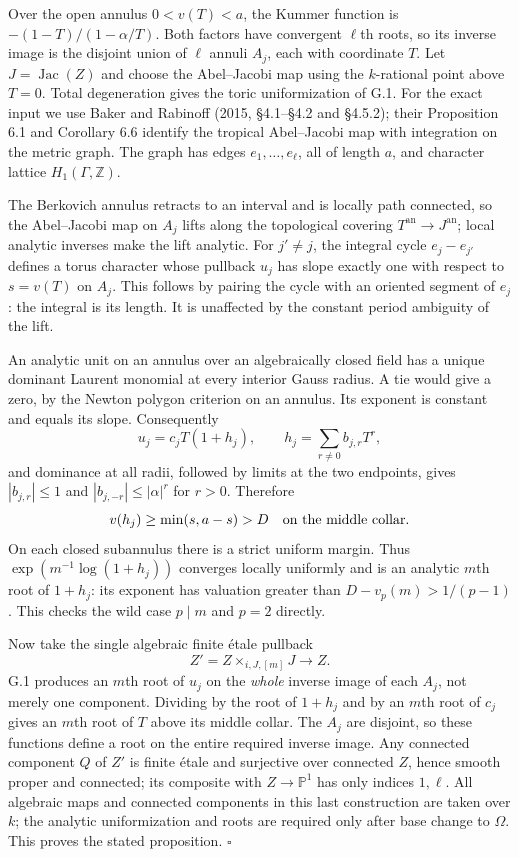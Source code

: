 \documentclass[10pt,a4paper]{article}
\begin{document}
Over the open annulus \(0<v(T)<a\), the Kummer function is \(-(1-T)/(1-\alpha/T)\). Both factors have convergent \(\ell\)th roots, so its inverse image is the disjoint union of \(\ell\) annuli \(A_j\), each with coordinate \(T\). Let \(J=\operatorname{Jac}(Z)\) and choose the Abel--Jacobi map using the \(k\)-rational point above \(T=0\). Total degeneration gives the toric uniformization of G.1. For the exact input we use Baker and Rabinoff (2015, \S{}4.1--\S{}4.2 and \S{}4.5.2); their Proposition 6.1 and Corollary 6.6 identify the tropical Abel--Jacobi map with integration on the metric graph. The graph has edges \(e_1,\ldots,e_\ell\), all of length \(a\), and character lattice \(H_1(\Gamma,\mathbb Z)\).

The Berkovich annulus retracts to an interval and is locally path connected, so the Abel--Jacobi map on \(A_j\) lifts along the topological covering \(T^{\mathrm{an}}\to J^{\mathrm{an}}\); local analytic inverses make the lift analytic. For \(j'\ne j\), the integral cycle \(e_j-e_{j'}\) defines a torus character whose pullback \(u_j\) has slope exactly one with respect to \(s=v(T)\) on \(A_j\). This follows by pairing the cycle with an oriented segment of \(e_j\): the integral is its length. It is unaffected by the constant period ambiguity of the lift.

An analytic unit on an annulus over an algebraically closed field has a unique dominant Laurent monomial at every interior Gauss radius. A tie would give a zero, by the Newton polygon criterion on an annulus. Its exponent is constant and equals its slope. Consequently \[
 u_j=c_jT(1+h_j),\qquad
 h_j=\sum_{r\ne0}b_{j,r}T^r,
\] and dominance at all radii, followed by limits at the two endpoints, gives \(|b_{j,r}|\leq1\) and \(|b_{j,-r}|\leq|\alpha|^r\) for \(r>0\). Therefore \[
 v(h_j)\geq\min(s,a-s)>D\quad\hbox{on the middle collar}.
\] On each closed subannulus there is a strict uniform margin. Thus \(\exp(m^{-1}\log(1+h_j))\) converges locally uniformly and is an analytic \(m\)th root of \(1+h_j\): its exponent has valuation greater than \(D-v_p(m)>1/(p-1)\). This checks the wild case \(p\mid m\) and \(p=2\) directly.

Now take the single algebraic finite \'{e}tale pullback \[
 Z'=Z\mathbin{\times}_{i,J,[m]}J\longrightarrow Z.
\] G.1 produces an \(m\)th root of \(u_j\) on the \emph{whole} inverse image of each \(A_j\), not merely one component. Dividing by the root of \(1+h_j\) and by an \(m\)th root of \(c_j\) gives an \(m\)th root of \(T\) above its middle collar. The \(A_j\) are disjoint, so these functions define a root on the entire required inverse image. Any connected component \(Q\) of \(Z'\) is finite \'{e}tale and surjective over connected \(Z\), hence smooth proper and connected; its composite with \(Z\to\mathbb P^1\) has only indices \(1,\ell\). All algebraic maps and connected components in this last construction are taken over \(k\); the analytic uniformization and roots are required only after base change to \(\Omega\). This proves the stated proposition. \(\square\)
\end{document}
